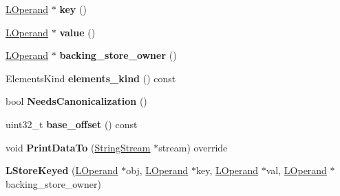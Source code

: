 \begin{DoxyCompactItemize}
\item 
\hyperlink{classv8_1_1internal_1_1_l_operand}{L\+Operand} $\ast$ {\bfseries key} ()\hypertarget{classv8_1_1internal_1_1_l_store_keyed_a768f44140c1abab8ec345ef73cb417ea}{}\label{classv8_1_1internal_1_1_l_store_keyed_a768f44140c1abab8ec345ef73cb417ea}

\item 
\hyperlink{classv8_1_1internal_1_1_l_operand}{L\+Operand} $\ast$ {\bfseries value} ()\hypertarget{classv8_1_1internal_1_1_l_store_keyed_a6a97e536a0eed02971eb915a57b6e898}{}\label{classv8_1_1internal_1_1_l_store_keyed_a6a97e536a0eed02971eb915a57b6e898}

\item 
\hyperlink{classv8_1_1internal_1_1_l_operand}{L\+Operand} $\ast$ {\bfseries backing\+\_\+store\+\_\+owner} ()\hypertarget{classv8_1_1internal_1_1_l_store_keyed_a21d192f5ddd6bbb5198880a6e2d03db3}{}\label{classv8_1_1internal_1_1_l_store_keyed_a21d192f5ddd6bbb5198880a6e2d03db3}

\item 
Elements\+Kind {\bfseries elements\+\_\+kind} () const \hypertarget{classv8_1_1internal_1_1_l_store_keyed_a09fd8ff5055daa16ec86a8f9bf4a1388}{}\label{classv8_1_1internal_1_1_l_store_keyed_a09fd8ff5055daa16ec86a8f9bf4a1388}

\item 
bool {\bfseries Needs\+Canonicalization} ()\hypertarget{classv8_1_1internal_1_1_l_store_keyed_a638212d8d0abef68447e1451b452ac14}{}\label{classv8_1_1internal_1_1_l_store_keyed_a638212d8d0abef68447e1451b452ac14}

\item 
uint32\+\_\+t {\bfseries base\+\_\+offset} () const \hypertarget{classv8_1_1internal_1_1_l_store_keyed_aa88021608606f53948b262edeccda1e6}{}\label{classv8_1_1internal_1_1_l_store_keyed_aa88021608606f53948b262edeccda1e6}

\item 
void {\bfseries Print\+Data\+To} (\hyperlink{classv8_1_1internal_1_1_string_stream}{String\+Stream} $\ast$stream) override\hypertarget{classv8_1_1internal_1_1_l_store_keyed_a6904d9c0c8c7e81ec9aab35f73978d38}{}\label{classv8_1_1internal_1_1_l_store_keyed_a6904d9c0c8c7e81ec9aab35f73978d38}

\item 
{\bfseries L\+Store\+Keyed} (\hyperlink{classv8_1_1internal_1_1_l_operand}{L\+Operand} $\ast$obj, \hyperlink{classv8_1_1internal_1_1_l_operand}{L\+Operand} $\ast$key, \hyperlink{classv8_1_1internal_1_1_l_operand}{L\+Operand} $\ast$val, \hyperlink{classv8_1_1internal_1_1_l_operand}{L\+Operand} $\ast$backing\+\_\+store\+\_\+owner)\hypertarget{classv8_1_1internal_1_1_l_store_keyed_af5f464336aea00a44cba982466a6fa1b}{}\label{classv8_1_1internal_1_1_l_store_keyed_af5f464336aea00a44cba982466a6fa1b}


\end{DoxyCompactItemize}
